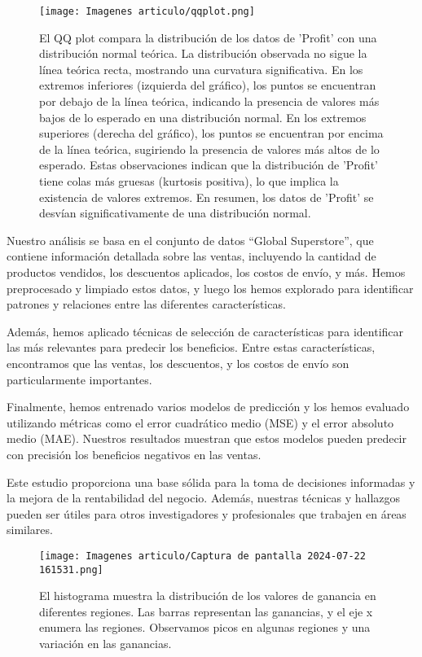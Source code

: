 \documentclass[preprint,12pt]{elsarticle}
\begin{document}
\begin{figure}[h]
    \centering
    \texttt{[image: Imagenes articulo/qqplot.png]} 
    \caption{El QQ plot compara la distribución de los datos de 'Profit' con una distribución normal teórica. La distribución observada no sigue la línea teórica recta, mostrando una curvatura significativa. 
    En los extremos inferiores (izquierda del gráfico), los puntos se encuentran por debajo de la línea teórica, indicando la presencia de valores más bajos de lo esperado en una distribución normal.
    En los extremos superiores (derecha del gráfico), los puntos se encuentran por encima de la línea teórica, sugiriendo la presencia de valores más altos de lo esperado. 
    Estas observaciones indican que la distribución de 'Profit' tiene colas más gruesas (kurtosis positiva), lo que implica la existencia de valores extremos. En resumen, los datos de 'Profit' se desvían significativamente de una distribución normal.}
    \label{fig:qqplot_profit}
\end{figure}

Nuestro análisis se basa en el conjunto de datos “Global Superstore”, que contiene información detallada sobre las ventas, incluyendo la cantidad de productos vendidos, los descuentos aplicados, los costos de envío, y más. Hemos preprocesado y limpiado estos datos, y luego los hemos explorado para identificar patrones y relaciones entre las diferentes características.

Además, hemos aplicado técnicas de selección de características para identificar las más relevantes para predecir los beneficios. Entre estas características, encontramos que las ventas, los descuentos, y los costos de envío son particularmente importantes.

Finalmente, hemos entrenado varios modelos de predicción y los hemos evaluado utilizando métricas como el error cuadrático medio (MSE) y el error absoluto medio (MAE). Nuestros resultados muestran que estos modelos pueden predecir con precisión los beneficios negativos en las ventas.

Este estudio proporciona una base sólida para la toma de decisiones informadas y la mejora de la rentabilidad del negocio. Además, nuestras técnicas y hallazgos pueden ser útiles para otros investigadores y profesionales que trabajen en áreas similares.

\begin{figure}[h]
    \centering
    \texttt{[image: Imagenes articulo/Captura de pantalla 2024-07-22 161531.png]} 
    \caption{El histograma muestra la distribución de los valores de ganancia en diferentes regiones. Las barras representan las ganancias, y el eje x enumera las regiones. Observamos picos en algunas regiones y una variación en las ganancias.}
    \label{fig:qqplot_profit}
\end{figure}
\end{document}
